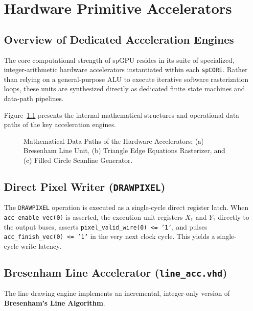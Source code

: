 \chapter{Hardware Primitive Accelerators}
\label{chap:hardware_accelerators}

\section{Overview of Dedicated Acceleration Engines}
The core computational strength of spGPU resides in its suite of specialized, integer-arithmetic hardware accelerators instantiated within each \texttt{spCORE}. Rather than relying on a general-purpose ALU to execute iterative software rasterization loops, these units are synthesized directly as dedicated finite state machines and data-path pipelines.

Figure~\ref{fig:accelerators} presents the internal mathematical structures and operational data paths of the key acceleration engines.

\begin{figure}[htbp]
\centering
\resizebox{0.95\textwidth}{!}{
    
}
\caption{Mathematical Data Paths of the Hardware Accelerators: (a) Bresenham Line Unit, (b) Triangle Edge Equations Rasterizer, and (c) Filled Circle Scanline Generator.}
\label{fig:accelerators}
\end{figure}

\section{Direct Pixel Writer (\texttt{DRAWPIXEL})}
The \texttt{DRAWPIXEL} operation is executed as a single-cycle direct register latch. When \texttt{acc\_enable\_vec(0)} is asserted, the execution unit registers $X_1$ and $Y_1$ directly to the output buses, asserts \texttt{pixel\_valid\_wire(0) <= '1'}, and pulses \texttt{acc\_finish\_vec(0) <= '1'} in the very next clock cycle. This yields a single-cycle write latency.

\section{Bresenham Line Accelerator (\texttt{line\_acc.vhd})}
The line drawing engine implements an incremental, integer-only version of \textbf{Bresenham's Line Algorithm}. 

